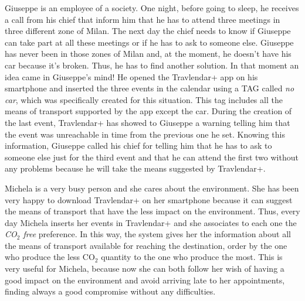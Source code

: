 
Giuseppe is an employee of a society. One night, before going to sleep, he receives a call from his chief that inform him that he has to attend three meetings in three different zone of Milan. The next day the chief needs to know if Giuseppe can take part at all these meetings or if he has to ask to someone else. Giuseppe has never been in those zones of Milan and, at the moment, he doesn’t have his car because it’s broken. Thus, he has to find another solution. 
In that moment an idea came in Giuseppe’s mind! He opened the Travlendar+ app on his smartphone and inserted the three events in the calendar using a TAG called \emph{no car}, which was specifically created for this situation. This tag includes all the means of transport supported by the app except the car. During the creation of the last event, Travlendar+ has showed to Giuseppe a warning telling him that the event was unreachable in time from the previous one he set. Knowing this information, Giuseppe called his chief for telling him that he has to ask to someone else just for the third event and that he can attend the first two without any problems because he will take the means suggested by Travlendar+.

Michela is a very busy person and she cares about the environment. She has been very happy to download Travlendar+ on her smartphone because it can suggest the means of transport that have the less impact on the environment. Thus, every day Michela inserts her events in Travlendar+ and she associates to each one the \emph{CO$_2$ free} preference. In this way, the system gives her the information about all the means of transport available for reaching the destination, order by the one who produce the less CO$_2$ quantity to the one who produce the most. This is very useful for Michela, because now she can both follow her wish of having a good impact on the environment and avoid arriving late to her appointments, finding always a good compromise without any difficulties.

